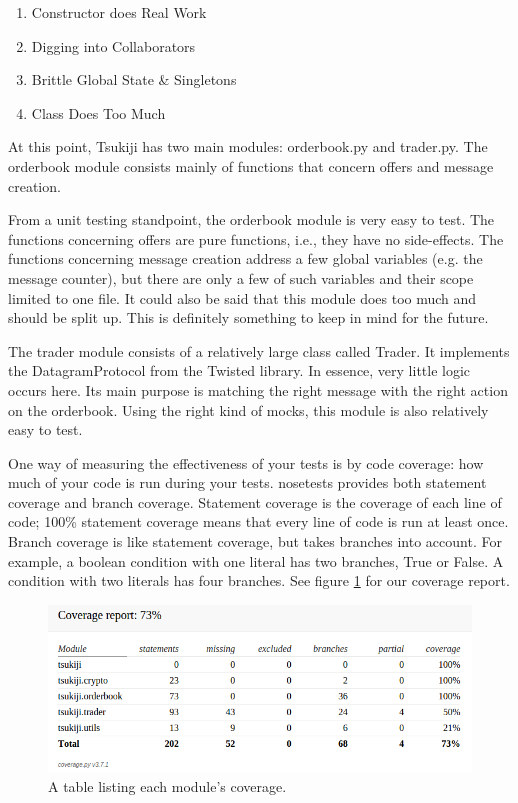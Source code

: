 \begin{enumerate}
\item Constructor does Real Work
\item Digging into Collaborators
\item Brittle Global State \& Singletons
\item Class Does Too Much
\end{enumerate}

At this point, Tsukiji has two main modules: orderbook.py and trader.py.
The orderbook module consists mainly of functions that concern offers and message creation.

From a unit testing standpoint, the orderbook module is very easy to test.
The functions concerning offers are pure functions, i.e., they have no side-effects.
The functions concerning message creation address a few global variables (e.g. the message counter), but there are only a few of such variables and their scope limited to one file.
It could also be said that this module does too much and should be split up.
This is definitely something to keep in mind for the future.

The trader module consists of a relatively large class called Trader.
It implements the DatagramProtocol from the Twisted library.
In essence, very little logic occurs here.
Its main purpose is matching the right message with the right action on the orderbook.
Using the right kind of mocks, this module is also relatively easy to test.

One way of measuring the effectiveness of your tests is by code coverage: how much of your code is run during your tests.
nosetests provides both statement coverage and branch coverage.
Statement coverage is the coverage of each line of code; 100\% statement coverage means that every line of code is run at least once.
Branch coverage is like statement coverage, but takes branches into account.
For example, a boolean condition with one literal has two branches, True or False.
A condition with two literals has four branches.
See figure \ref{coveragefig} for our coverage report.

\begin{figure}
  \centering
  \includegraphics[width=\textwidth]{coverage}
  \caption{A table listing each module's coverage.}
  \label{coveragefig}
\end{figure}


